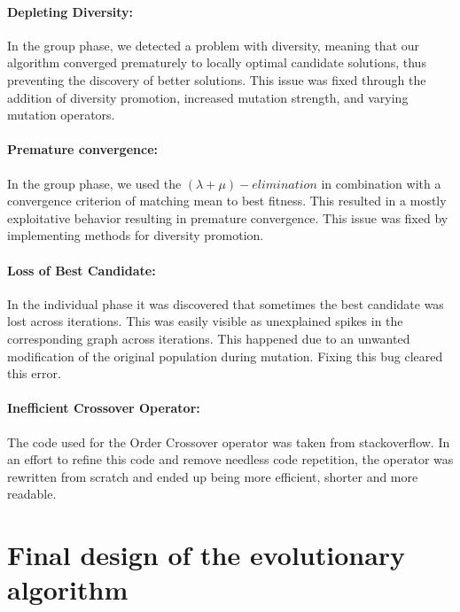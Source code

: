 \documentclass[a4paper,10pt]{article}
\newcommand{\RemoveMe}[1]{{\color{purple}#1}}
\begin{document}
\paragraph{Depleting Diversity:} In the group phase, we detected a problem with diversity, meaning that our algorithm converged prematurely to locally optimal candidate solutions, thus preventing the discovery of better solutions. This issue was fixed through the addition of diversity promotion, increased mutation strength, and varying mutation operators.

\paragraph{Premature convergence:} In the group phase, we used the $(\lambda+\mu)-elimination$ in combination with a convergence criterion of matching mean to best fitness. This resulted in a mostly exploitative behavior resulting in premature convergence. This issue was fixed by implementing methods for diversity promotion.

\paragraph{Loss of Best Candidate:} In the individual phase it was discovered that sometimes the best candidate was lost across iterations. This was easily visible as unexplained spikes in the corresponding graph across iterations. This happened due to an unwanted modification of the original population during mutation. Fixing this bug cleared this error.

\paragraph{Inefficient Crossover Operator:} The code used for the Order Crossover operator was taken from stackoverflow. In an effort to refine this code and remove needless code repetition, the operator was rewritten from scratch and ended up being more efficient, shorter and more readable.

\section{Final design of the evolutionary algorithm} 

\end{document}
